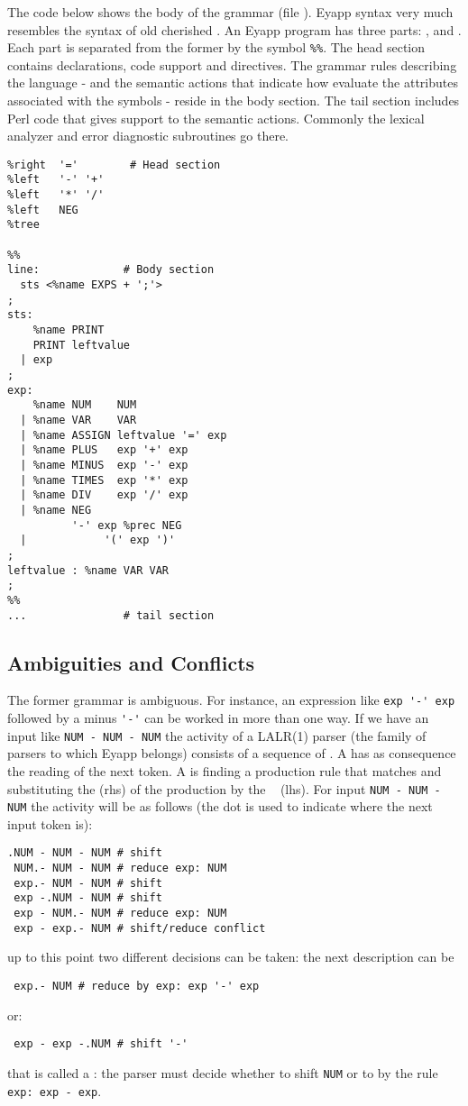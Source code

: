 The code below shows the body of the grammar (file 
).
Eyapp syntax very much resembles the syntax of
old cherished  \cite{yacc}.
An Eyapp program has three parts: ,  and .
Each part is separated from the former by the symbol \verb|%%|.
The head section contains declarations, code support
and directives.
The grammar rules describing
the language - and the semantic actions that indicate how
evaluate the attributes associated with the symbols -
reside in the body section.
The tail section includes Perl code that gives support
to the semantic actions. Commonly 
the lexical analyzer and error diagnostic subroutines
go there.
 

\begin{verbatim}
%right  '='        # Head section
%left   '-' '+'
%left   '*' '/'
%left   NEG
%tree 

%%
line:             # Body section
  sts <%name EXPS + ';'>
;
sts:
    %name PRINT
    PRINT leftvalue
  | exp 
;
exp:
    %name NUM    NUM
  | %name VAR    VAR
  | %name ASSIGN leftvalue '=' exp
  | %name PLUS   exp '+' exp
  | %name MINUS  exp '-' exp
  | %name TIMES  exp '*' exp
  | %name DIV    exp '/' exp
  | %name NEG
          '-' exp %prec NEG
  |            '(' exp ')'
;
leftvalue : %name VAR VAR
;
%% 
...               # tail section
\end{verbatim}

\subsection{Ambiguities and Conflicts}
The former grammar is ambiguous.
For instance, an expression like \verb|exp '-' exp| followed by a
minus \verb|'-'| can be worked in more than one way. If we
have an input like \verb|NUM - NUM - NUM| the activity of a LALR(1) parser
(the family of parsers to which Eyapp belongs)
consists of a sequence of . A 
has as consequence the reading of the next token. A 
is finding a production rule that matches and substituting 
the  (rhs) of the production by the \
 (lhs).  For input \verb|NUM - NUM - NUM|
the activity will be as follows (the dot is used to indicate where the next 
input token is):


\begin{verbatim}
.NUM - NUM - NUM # shift
 NUM.- NUM - NUM # reduce exp: NUM 
 exp.- NUM - NUM # shift
 exp -.NUM - NUM # shift
 exp - NUM.- NUM # reduce exp: NUM
 exp - exp.- NUM # shift/reduce conflict
\end{verbatim}
up to this point two different decisions can be taken: the next description can be
\begin{verbatim}
 exp.- NUM # reduce by exp: exp '-' exp 
\end{verbatim}
or:
\begin{verbatim}
 exp - exp -.NUM # shift '-' 
\end{verbatim}
that is called a : the parser must decide
whether to shift \verb|NUM| or to \I{reduce} by the rule \verb|exp: exp - exp|.

